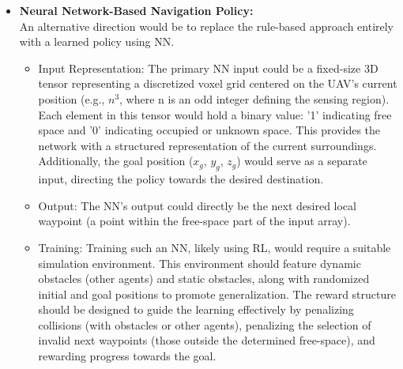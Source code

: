 \begin{itemize}
            \item \textbf{Neural Network-Based Navigation Policy: } \\
                An alternative direction would be to replace the rule-based approach entirely with a learned policy using \ac{NN}.
                \begin{itemize}
                    \item Input Representation: The primary \ac{NN} input could be a fixed-size 3D tensor representing a discretized voxel grid centered on the \ac{UAV}'s current position (e.g., $n^{3}$, where n is an odd integer defining the sensing region). 
                    Each element in this tensor would hold a binary value: '1' indicating free space and '0' indicating occupied or unknown space. 
                    This provides the network with a structured representation of the current surroundings. 
                    Additionally, the goal position ($x_g$, $y_g$, $z_g$) would serve as a separate input, directing the policy towards the desired destination. 
                    \item Output: The \ac{NN}'s output could directly be the next desired local waypoint (a point within the free-space part of the input array).
                    \item Training: Training such an \ac{NN}, likely using \ac{RL}, would require a suitable simulation environment. 
                    This environment should feature dynamic obstacles (other agents) and static obstacles, along with randomized initial and goal positions to promote generalization. 
                    The reward structure should be designed to guide the learning effectively by penalizing collisions (with obstacles or other agents), penalizing the selection of invalid next waypoints (those outside the determined free-space), and rewarding progress towards the goal.
                \end{itemize}
        \end{itemize}

        



